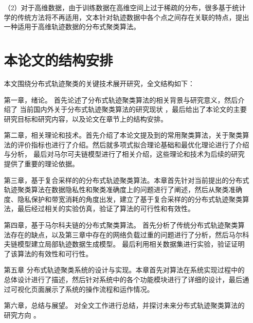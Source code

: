 （2）对于高维数据，由于训练数据在高维空间上过于稀疏的分布，很多基于统计学的传统方法将不再适用，文本针对轨迹数据中各个点之间存在关联的特点，提出一种适用于高维轨迹数据的分布式聚类算法。


\section{本论文的结构安排}
本文围绕分布式轨迹聚类的关键技术展开研究，全文结构如下：

第一章，绪论。 首先论述了分布式轨迹聚类算法的相关背景与研究意义，然后介绍了 当前国内外关于分布式轨迹聚类算法的研究现状 ，最后给出了本论文的主要研究目标和研究内容，以及论文在章节上的结构安排。

第二章，相关理论和技术。首先介绍了本论文提及到的常用聚类算法，关于聚类算法的评价指标也进行了介绍。然后就多项式拟合理论基础和最优化理论进行了介绍与分析， 最后对马尔可夫链模型进行了相关介绍，这些理论和技术为后续的研究提供了重要的理论依据。

第三章，基于复合采样的的分布式轨迹聚类算法。本章首先针对当前提出的分布式轨迹聚类算法在数据隐私性和聚类准确度上的问题进行了阐述，然后从聚类准确度、隐私保护和带宽消耗的角度出发，建立了基于复合采样的的分布式轨迹聚类算法，最后经过相关的实验仿真，验证了算法的可行性和有效性。

第四章，基于马尔科夫链的分布式聚类算法。 首先分析了传统分布式轨迹聚类算法存在的缺点，以及第三章中存在的网络负载过重的问题进行了分析，然后马尔科夫链模型建立局部轨迹数据生成模型。 最后利用相关数据集进行实验，验证证明了该算法的有效性和可行性。

第五章 分布式轨迹聚类系统的设计与实现。本章首先对算法在系统实现过程中的总体设计进行了描述，然后针对系统中的各个功能模块进行了详细的设计，最后通过可视化页面展示了系统的操作流程和运作情况。

第六章，总结与展望。 对全文工作进行总结，并探讨未来分布式轨迹聚类算法的研究方向 。